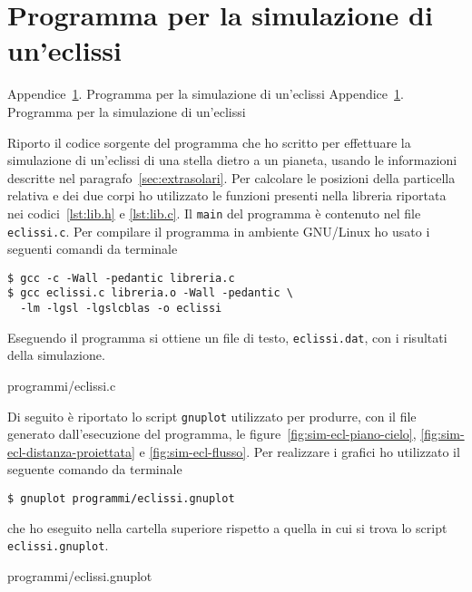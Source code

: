 \cleardoublepage{}
\chapter{Programma per la simulazione di un'eclissi}
\label{cha:simulazione-eclissi}
\markboth%
{Appendice~\ref{cha:simulazione-eclissi}. Programma per la simulazione di
  un'eclissi}%
{Appendice~\ref{cha:simulazione-eclissi}. Programma per la simulazione di
  un'eclissi}

Riporto il codice sorgente del programma che ho scritto per effettuare la
simulazione di un'eclissi di una stella dietro a un pianeta, usando le
informazioni descritte nel paragrafo~\ref{sec:extrasolari}. Per calcolare le
posizioni della particella relativa e dei due corpi ho utilizzato le funzioni
presenti nella libreria riportata nei codici~\ref{lst:lib.h} e
\ref{lst:lib.c}. Il \verb|main| del programma è contenuto nel file
\verb|eclissi.c|. Per compilare il programma in ambiente GNU/Linux ho usato i
seguenti comandi da terminale
\begin{verbatim}
$ gcc -c -Wall -pedantic libreria.c
$ gcc eclissi.c libreria.o -Wall -pedantic \
  -lm -lgsl -lgslcblas -o eclissi
\end{verbatim}
Eseguendo il programma si ottiene un file di testo, \verb|eclissi.dat|, con i
risultati della simulazione.

{programmi/eclissi.c}

Di seguito è riportato lo script \verb|gnuplot| utilizzato per produrre, con il
file generato dall'esecuzione del programma, le
figure~\ref{fig:sim-ecl-piano-cielo}, \ref{fig:sim-ecl-distanza-proiettata} e
\ref{fig:sim-ecl-flusso}. Per realizzare i grafici ho utilizzato il seguente
comando da terminale
\begin{verbatim}
$ gnuplot programmi/eclissi.gnuplot
\end{verbatim}
che ho eseguito nella cartella superiore rispetto a quella in cui si trova lo
script \verb|eclissi.gnuplot|.

{programmi/eclissi.gnuplot}

